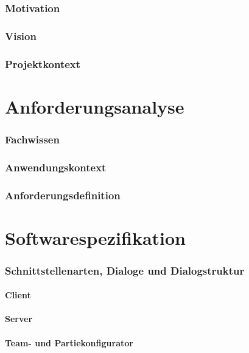 \documentclass[a4paper,12pt,
headsepline,           %
oneside,               %
pointlessnumbers,      %
bibtotoc,              %
]{scrartcl}
\begin{document}
    \section{Motivation}
    \section{Vision}
    \section{Projektkontext}

    \part{Anforderungsanalyse} 
    \section{Fachwissen}
    
    \section{Anwendungskontext}
    
    \section{Anforderungsdefinition}
     

    \part{Softwarespezifikation}
    \section{Schnittstellenarten, Dialoge und Dialogstruktur}
    \subsection{Client}
    
    \subsection{Server}
    
    \subsection{Team- und Partiekonfigurator}
    
\end{document}
